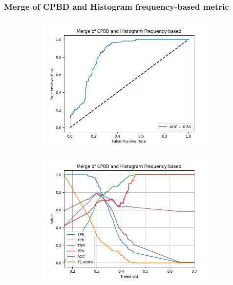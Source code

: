 \subsubsection{Merge of CPBD and Histogram frequency-based metric}
\begin{figure}[H]
    \centering
    \begin{subfigure}[t]{0.48\textwidth}
        \includegraphics[width=\textwidth]{Figures/BlurredImages/results_on_thresholds/output_roc_cpbd_hf.png}
        \caption{}
        \label{fig:CPBD_HF_roc}
    \end{subfigure}\hspace{1em}
    \begin{subfigure}[t]{0.48\textwidth}
        \includegraphics[width=\textwidth]{Figures/BlurredImages/results_on_thresholds/threshold_test_scores_cpbd_hf.png}

\end{subfigure}
\end{figure}
